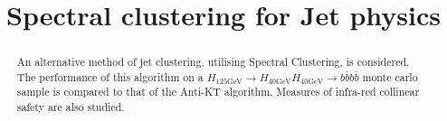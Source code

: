 \documentclass{article}
\begin{document}
\title{Spectral clustering for Jet physics}
	
	\maketitle
	
    \FloatBarrier
    \begin{abstract}
        An alternative method of jet clustering, utilising Spectral Clustering, is considered.
        The performance of this algorithm on a \(H_{125\text{GeV}} \rightarrow H_{40\text{GeV}} H_{40\text{GeV}} \rightarrow b \bar{b} b \bar{b}\)
        monte carlo sample is compared to that of the Anti-KT algorithm.
        Measures of infra-red collinear safety are also studied.
	\end{abstract}
     
    \FloatBarrier
    \FloatBarrier
    
    \FloatBarrier
    
    \FloatBarrier
    
    \FloatBarrier
    
    \FloatBarrier
    \printbibliography	
\end{document}
